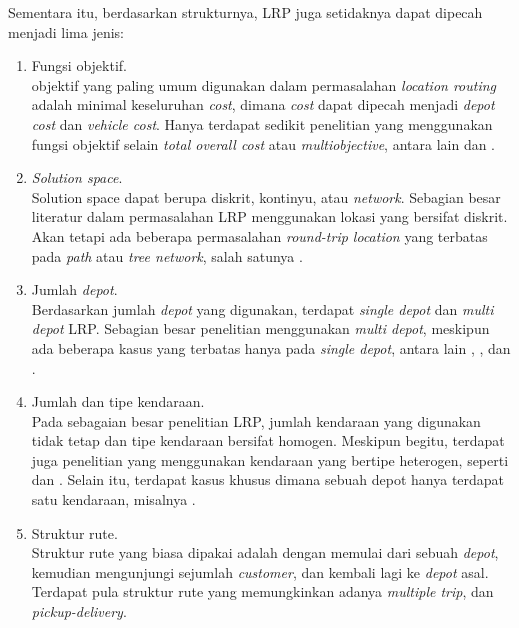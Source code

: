 Sementara itu, berdasarkan strukturnya, LRP juga setidaknya dapat dipecah menjadi lima jenis:
\begin{enumerate}
\item Fungsi objektif. \\
	objektif yang paling umum digunakan dalam permasalahan \textit{location routing} adalah minimal keseluruhan \textit{cost}, dimana \textit{cost} dapat dipecah menjadi \textit{depot cost} dan \textit{vehicle cost}. Hanya terdapat sedikit penelitian yang menggunakan fungsi objektif selain \textit{total overall cost} atau \textit{multiobjective}, antara lain \citep{averbakh_technical_1994} dan \citep{averbakh_probabilistic_1995}.
\item \textit{Solution space}. \\
	Solution space dapat berupa diskrit, kontinyu, atau \textit{network}. Sebagian besar literatur dalam permasalahan LRP menggunakan lokasi yang bersifat diskrit. Akan tetapi ada beberapa permasalahan \textit{round-trip location} yang terbatas pada \textit{path} atau \textit{tree network}, salah satunya \citep{simchi-levi_capacitated_1991}.
\item  Jumlah \textit{depot}. \\
	Berdasarkan jumlah \textit{depot} yang digunakan, terdapat \textit{single depot} dan \textit{multi depot} LRP. Sebagian besar penelitian menggunakan \textit{multi depot}, meskipun ada beberapa kasus yang terbatas hanya pada \textit{single depot}, antara lain \citep{laporte_exact_1981}, \citep{averbakh_technical_1994}, dan \citep{simchi-levi_capacitated_1991}. 
\item Jumlah dan tipe kendaraan. \\
	Pada sebagaian besar penelitian LRP, jumlah kendaraan yang digunakan tidak tetap dan tipe kendaraan bersifat homogen. Meskipun begitu, terdapat juga penelitian yang menggunakan kendaraan yang bertipe heterogen, seperti \citep{bookbinder_vehicle_1988} dan \citep{salhi_intergrated_1996}. Selain itu, terdapat kasus khusus dimana sebuah depot hanya terdapat satu kendaraan, misalnya \citep{branco_hamiltonian_1990}.
\item Struktur rute. \\
	Struktur rute yang biasa dipakai adalah dengan memulai dari sebuah \textit{depot}, kemudian mengunjungi sejumlah \textit{customer}, dan kembali lagi ke \textit{depot} asal. Terdapat pula struktur rute yang memungkinkan adanya \textit{multiple trip}, dan \textit{pickup-delivery}.
\end{enumerate}


